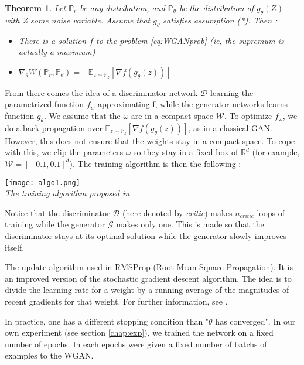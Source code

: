 \documentclass[a4paper]{article}
\newcommand{\G}{\mathcal{G}}
\newcommand{\D}{\mathcal{D}}
\newcommand{\W}{\mathcal{W}}
\newcommand{\Expec}{\mathbb{E}}
\newcommand{\Prob}{\mathbb{P}}
\newcommand{\real}{\mathbb{R}}
\theoremstyle{plain}
\newtheorem{thm}{Theorem}
\theoremstyle{remark}
\theoremstyle{definition}
\begin{document}
\begin{thm}
\label{thm:exist_opt}
Let $\Prob_r$ be any distribution, and $\Prob_\theta$ be the distribution of $g_\theta(Z)$ with Z some noise variable. Assume that $g_\theta$ satisfies assumption (*). Then :
\begin{itemize}
\item There is a solution $f$ to the problem \ref{eq:WGANprob} (ie, the supremum is actually a maximum)
\item $\nabla_\theta W(\Prob_r, \Prob_\theta) = - \Expec_{z \sim \Prob_z}[\nabla f(g_\theta(z))]$
\end{itemize}
\end{thm}

From there comes the idea of a discriminator network $\D$ learning the parametrized function $f_w$ approximating f, while the generator networks learns function $g_\theta$. We assume that the $\omega$ are in a compact space $\W$. To optimize $f_\omega$, we do a back propagation over $\Expec_{z \sim \Prob_z}[\nabla f(g_\theta(z))]$, as in a classical GAN.
However, this does not ensure that the weights stay in a compact space. To cope with this, we clip the parameters $\omega$ so they stay in a fixed box of $\real^d$ (for example, $\W = [-0.1,0.1]^d$). The training algorithm is then the following :

\begin{center}
	\texttt{[image: algo1.png]} \\
	\label{alg:1}
    \emph{The training algorithm proposed in \cite{arjovsky2017wasserstein}}
\end{center} 

Notice that the discriminator $\D$ (here denoted by \emph{critic}) makes $n_{critic}$ loops of training while the generator $\G$ makes only one. This is made so that the discriminator stays at its optimal solution while the generator slowly improves itself.

The update algorithm used in RMSProp (Root Mean Square Propagation). It is an improved version of the stochastic gradient descent algorithm. The idea is to divide the learning rate for a weight by a running average of the magnitudes of recent gradients for that weight. For further information, see \cite{tieleman2012lecture}.

In practice, one has a different stopping condition than "$\theta$ has converged". In our own experiment (see section \ref{chap:exp}), we trained the network on a fixed number of epochs. In each epochs were given a fixed number of batchs of examples to the WGAN.
\end{document}

